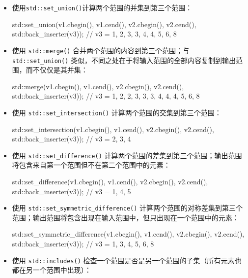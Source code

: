 \begin{itemize}
\item
使用\verb|std::set_union()|计算两个范围的并集到第三个范围：

\begin{cpp}
std::set_union(v1.cbegin(), v1.cend(),
               v2.cbegin(), v2.cend(),
               std::back_inserter(v3));
// v3 = {1, 2, 3, 3, 4, 4, 5, 6, 8}
\end{cpp}

\item
使用 \verb|std::merge()| 合并两个范围的内容到第三个范围；与 \verb|std::set_union()| 类似，不同之处在于将输入范围的全部内容复制到输出范围，而不仅仅是其并集：

\begin{cpp}
std::merge(v1.cbegin(), v1.cend(),
           v2.cbegin(), v2.cend(),
           std::back_inserter(v3));
// v3 = {1, 2, 2, 3, 3, 3, 4, 4, 4, 5, 6, 8}
\end{cpp}

\item
使用 \verb|std::set_intersection()| 计算两个范围的交集到第三个范围：

\begin{cpp}
std::set_intersection(v1.cbegin(), v1.cend(),
                      v2.cbegin(), v2.cend(),
                      std::back_inserter(v3));
// v3 = {2, 3, 4}
\end{cpp}

\item
使用 \verb|std::set_difference()| 计算两个范围的差集到第三个范围；输出范围将包含来自第一个范围但不在第二个范围中的元素：

\begin{cpp}
std::set_difference(v1.cbegin(), v1.cend(),
                    v2.cbegin(), v2.cend(),
                    std::back_inserter(v3));
// v3 = {1, 4, 5}
\end{cpp}

\item
使用 \verb|std::set_symmetric_difference()| 计算两个范围的对称差集到第三个范围；输出范围将包含出现在输入范围中，但只出现在一个范围中的元素：

\begin{cpp}
std::set_symmetric_difference(v1.cbegin(), v1.cend(),
                              v2.cbegin(), v2.cend(),
                              std::back_inserter(v3));
// v3 = {1, 3, 4, 5, 6, 8}
\end{cpp}

\item
使用 \verb|std::includes()| 检查一个范围是否是另一个范围的子集（所有元素也都在另一个范围中出现）：


\end{itemize}
